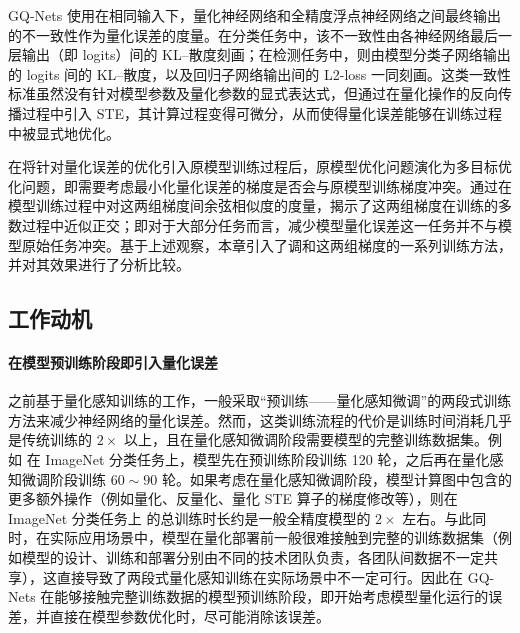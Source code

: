 \documentclass[
  fontset = mac,
]{shtthesis}
\begin{document}
GQ-Nets 使用在相同输入下，量化神经网络和全精度浮点神经网络之间最终输出的不一致性作为量化误差的度量。在分类任务中，该不一致性由各神经网络最后一层输出（即 logits）间的 KL--散度刻画；在检测任务中，则由模型分类子网络输出的 logits 间的 KL--散度，以及回归子网络输出间的 L2-loss 一同刻画。这类一致性标准虽然没有针对模型参数及量化参数的显式表达式，但通过在量化操作的反向传播过程中引入 STE，其计算过程变得可微分，从而使得量化误差能够在训练过程中被显式地优化。

在将针对量化误差的优化引入原模型训练过程后，原模型优化问题演化为多目标优化问题，即需要考虑最小化量化误差的梯度是否会与原模型训练梯度冲突。通过在模型训练过程中对这两组梯度间余弦相似度的度量，揭示了这两组梯度在训练的多数过程中近似正交；即对于大部分任务而言，减少模型量化误差这一任务并不与模型原始任务冲突。基于上述观察，本章引入了调和这两组梯度的一系列训练方法，并对其效果进行了分析比较。
\subsection{工作动机}
\paragraph{在模型预训练阶段即引入量化误差}
之前基于量化感知训练的工作，一般采取“预训练——量化感知微调”的两段式训练方法来减少神经网络的量化误差。然而，这类训练流程的代价是训练时间消耗几乎是传统训练的 $2\times$ 以上，且在量化感知微调阶段需要模型的完整训练数据集。例如 \citet{jung2019learning} 在 ImageNet 分类任务上，模型先在预训练阶段训练 120 轮，之后再在量化感知微调阶段训练 $60\sim 90$ 轮。如果考虑在量化感知微调阶段，模型计算图中包含的更多额外操作（例如量化、反量化、量化 STE 算子的梯度修改等），则在 ImageNet 分类任务上 \citet{jung2019learning} 的总训练时长约是一般全精度模型的 $2\times$ 左右。与此同时，在实际应用场景中，模型在量化部署前一般很难接触到完整的训练数据集（例如模型的设计、训练和部署分别由不同的技术团队负责，各团队间数据不一定共享），这直接导致了两段式量化感知训练在实际场景中不一定可行。因此在 GQ-Nets 在能够接触完整训练数据的模型预训练阶段，即开始考虑模型量化运行的误差，并直接在模型参数优化时，尽可能消除该误差。
\end{document}
